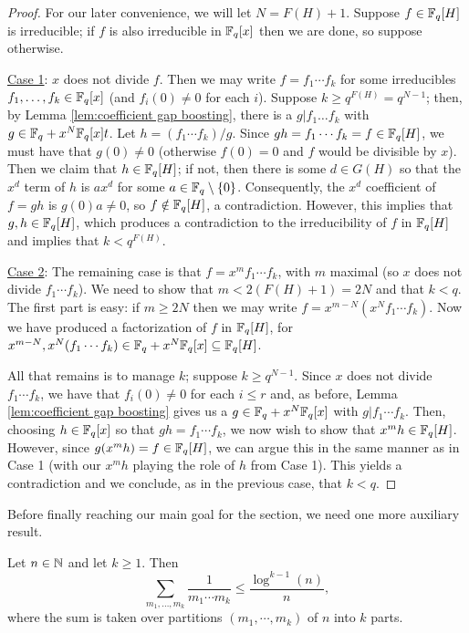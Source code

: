 \begin{proof}
For our later convenience, we will let $N = F(H)+1$.
Suppose $f\in \mathbb{F}_q[H]$ is irreducible; if $f$ is also irreducible in $\mathbb{F}_q[x]$ then we are done, so suppose otherwise.  

\underline{Case 1}: $x$ does not divide $f$.
Then we may write $f = f_1\cdots f_k$ for some irreducibles $f_1,\dots,f_k\in \mathbb{F}_q[x]$ (and $f_i(0)\neq0$ for each $i$).
Suppose $k\ge q^{F(H)} = q^{N-1}$; then, by Lemma \ref{lem:coefficient gap boosting}, there is a $g|f_1\dots f_k$ with $g\in \mathbb{F}_q+x^N \mathbb{F}_q[x]t$.
Let $h = (f_1\cdots f_k)/g$.
Since $gh = f_1\cdots f_k = f \in \mathbb{F}_q[H]$, we must have that $g(0) \neq 0$ (otherwise $f(0)=0$ and $f$ would be divisible by $x$).
Then we claim that $h\in \mathbb{F}_q[H]$; if not, then there is some $d\in G(H)$ so that the $x^d$ term of $h$ is $a x^d$ for some $a\in \mathbb{F}_q\setminus\{0\}$.
Consequently, the $x^d$ coefficient of $f = gh$ is $g(0)a \neq 0$, so $f\notin \mathbb{F}_q[H]$, a contradiction.
However, this implies that $g,h\in \mathbb{F}_q[H]$, which produces a contradiction to the irreducibility of $f$ in $\mathbb{F}_q[H]$ and implies that $k < q^{F(H)}$.

\underline{Case 2}: The remaining case is that $f = x^m f_1\cdots f_k$, with $m$ maximal (so $x$ does not divide $f_1\cdots f_k$).
We need to show that $m<2(F(H)+1) = 2N$ and that $k<q$.
The first part is easy: if $m\ge 2N$ then we may write $f = x^{m-N} (x^N f_1\cdots f_k)$.
Now we have produced a factorization of $f$ in $\mathbb{F}_q[H]$, for $x^{m-N}, x^N (f_1\cdots f_k) \in \mathbb{F}_q + x^N \mathbb{F}_q[x] \subseteq \mathbb{F}_q[H]$.

All that remains is to manage $k$; suppose $k \ge q^{N-1}$.
Since $x$ does not divide $f_1 \cdots f_k$, we have that $f_i(0) \neq 0$ for each $i\le r$ and, as before, Lemma \ref{lem:coefficient gap boosting} gives us a $g\in \mathbb{F}_q+x^N \mathbb{F}_q[x]$ with $g|f_1\cdots f_k$.
Then, choosing $h\in \mathbb{F}_q[x]$ so that $gh = f_1\cdots f_k$, we now wish to show that $x^m h \in \mathbb{F}_q[H]$.
However, since $g (x^m h) = f \in \mathbb{F}_q[H]$, we can argue this in the same manner as in Case 1 (with our $x^m h$ playing the role of $h$ from Case 1).
This yields a contradiction and we conclude, as in the previous case, that $k< q$.
\end{proof}

Before finally reaching our main goal for the section, we need one more auxiliary result.

\begin{lemma}\label{lem:srpp log bound}
	Let $n\in \mathbb{N}$ and let $k\ge 1$. 
	Then
	\[\sum_{m_1,\dots,m_k} \frac{1}{m_1\cdots m_k} \le \frac{\log^{k-1}(n)}{n}, \]
	where the sum is taken over partitions $(m_1,\cdots,m_k)$ of $n$ into $k$ parts.
\end{lemma}

